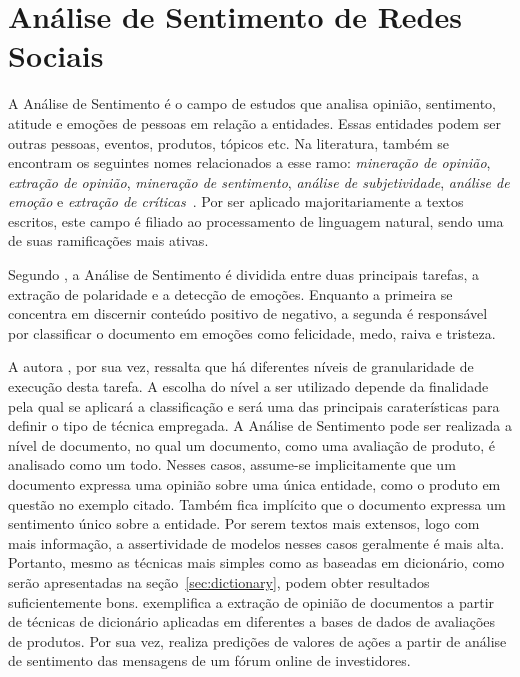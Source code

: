 \chapter{Análise de Sentimento de Redes Sociais}
\label{chapter:sentiment}

A Análise de Sentimento é o campo de estudos que analisa opinião, sentimento,
atitude e emoções de pessoas em relação a entidades.
Essas entidades podem ser outras pessoas, eventos, produtos, tópicos etc.
Na literatura, também se encontram os seguintes nomes relacionados a esse ramo:
\textit{mineração de opinião}, \textit{extração de opinião},
\textit{mineração de sentimento}, \textit{análise de subjetividade},
\textit{análise de emoção} e \textit{extração de críticas}~\cite{liu15}.
Por ser aplicado majoritariamente a textos escritos, este campo é filiado
ao processamento de linguagem natural, sendo uma de suas ramificações mais
ativas.

Segundo \citet{cambria16}, a Análise de Sentimento é dividida entre duas
principais tarefas, a extração de polaridade e a detecção de emoções.
Enquanto a primeira se concentra em discernir conteúdo positivo de negativo,
a segunda é responsável por classificar o documento em emoções como felicidade,
medo, raiva e tristeza.

A autora \citet{liu15}, por sua vez, ressalta que há diferentes níveis de
granularidade de execução desta tarefa.
A escolha do nível a ser utilizado depende da finalidade pela qual se aplicará
a classificação e será uma das principais caraterísticas para definir o tipo
de técnica empregada.
A Análise de Sentimento pode ser realizada a nível de documento, no qual um
documento, como uma avaliação de produto, é analisado como um todo.
Nesses casos, assume-se implicitamente que um documento expressa uma opinião
sobre uma única entidade, como o produto em questão no exemplo citado.
Também fica implícito que o documento expressa um sentimento único sobre a
entidade.
Por serem textos mais extensos, logo com mais informação, a assertividade de
modelos nesses casos geralmente é mais alta.
Portanto, mesmo as técnicas mais simples como as baseadas em dicionário, como
serão apresentadas na seção~\ref{sec:dictionary}, podem obter resultados
suficientemente bons.
\citet{taboada11} exemplifica a extração de opinião de documentos a partir de
técnicas de dicionário aplicadas em diferentes a bases de dados de avaliações de
produtos.
Por sua vez, \citet{das07} realiza predições de valores de ações a partir de
análise de sentimento das mensagens de um fórum online de investidores.

